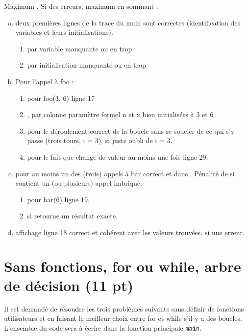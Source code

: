 \begin{baremeenv}
 Maximum . Si des erreurs, maximum  en sommant :
  \begin{enumerate}[(a)]
\item {} deux premières lignes de la trace du main sont correctes
  (identification des variables et leurs initialisations).
  \begin{enumerate}[$\ast$]
  \item {} par variable manquante ou en trop
  \item {} par initialisation manquante ou en trop
  \end{enumerate}
\item {} Pour l'appel à foo :
  \begin{enumerate}[$\ast$]
  \item {} pour foo(3, 6) ligne 17
\item {},  par colonne paramètre formel n et x bien
  initialisées à 3 et 6
\item {} pour le déroulement correct de la boucle sans se
  soucier de ce qui s'y passe (trois tours, i
  = 3),  si juste oubli de i = 3.
\item {} pour le fait que  change de valeur au moins une
  fois ligne 29.
 \end{enumerate}
\item {}  pour au moins un des (trois) appels à bar
  correct et dans . Pénalité de  si contient un  (ou
  plusieurs) appel imbriqué.
  \begin{enumerate}[$\ast$]
  \item {} pour bar(6) ligne 19.
\item {} si retourne un résultat exacte.
\end{enumerate}
\item {} affichage ligne 18 correct et cohérent avec les
  valeurs trouvées.  si une erreur.
\end{enumerate}
\end{baremeenv}

\section{Sans fonctions, for ou while, arbre de décision (11 pt)}

Il est demandé de résoudre les trois problèmes suivants sans définir de
fonctions utilisateurs et en faisant le meilleur choix entre for et
while s'il y a des boucles.  L'ensemble du code sera à écrire dans la
fonction principale \verb|main|.

